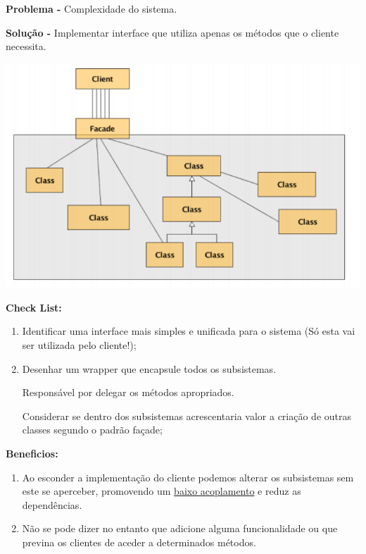 \documentclass{article}
\begin{document}
\begin{flushleft}
    \textbf{Problema -} Complexidade do sistema.
\end{flushleft}

\begin{flushleft}
    \textbf{Solução -} Implementar interface que utiliza apenas os métodos que o cliente necessita.

    \begin{center}
        \includegraphics[scale=0.35]{Images/50.png}
    \end{center}
\end{flushleft}

\begin{flushleft}
    \textbf{Check List:}

    \begin{enumerate}
        \item Identificar uma interface mais simples e unificada para o sistema
        (Só esta vai ser utilizada pelo cliente!);
        \item Desenhar um wrapper que encapsule todos os subsistemas.
        
        Responsável por delegar os métodos apropriados.
        
        Considerar se dentro dos subsistemas acrescentaria valor a criação de
        outras classes segundo o padrão façade;
    \end{enumerate}
\end{flushleft}

\begin{flushleft}
    \textbf{Beneficios:}

    \begin{enumerate}
        \item Ao esconder a implementação do cliente podemos alterar os subsistemas sem este
        se aperceber, promovendo um \uline{baixo acoplamento} e reduz as dependências.
        \item Não se pode dizer no entanto que adicione alguma funcionalidade ou que previna os
        clientes de aceder a determinados métodos.
    \end{enumerate}
\end{flushleft}
\end{document}
